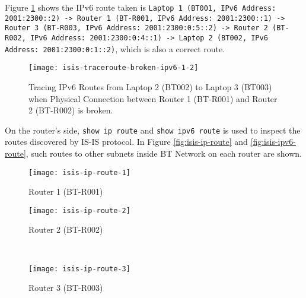 Figure \ref{fig:isis-traceroute-broken-ipv6} shows the IPv6 route taken is 
\texttt{Laptop 1 (BT001, IPv6 Address: 2001:2300::2)
-> Router 1 (BT-R001, IPv6 Address: 2001:2300::1) 
-> Router 3 (BT-R003, IPv6 Address: 2001:2300:0:5::2) 
-> Router 2 (BT-R002, IPv6 Address: 2001:2300:0:4::1)
-> Laptop 2 (BT002, IPv6 Address: 2001:2300:0:1::2)}, which is also a correct route.

\begin{figure}[ht!]
    \centering
    \texttt{[image: isis-traceroute-broken-ipv6-1-2]}
    \caption{Tracing IPv6 Routes from Laptop 2 (BT002) to Laptop 3 (BT003) when Physical Connection between Router 1 (BT-R001) and Router 2 (BT-R002) is broken.}
    \label{fig:isis-traceroute-broken-ipv6}
\end{figure}

\clearpage

On the router's side, \texttt{show ip route} and \texttt{show ipv6 route} is used to inspect the routes discovered by IS-IS protocol. In Figure \ref{fig:isis-ip-route} and \ref{fig:isis-ipv6-route}, such routes to other subnets inside BT Network on each router are shown.

\begin{figure*}[ht!]
    \centering
    \begin{subfigure}[b]{0.67\textwidth}
        \centering
        \texttt{[image: isis-ip-route-1]}
        \caption{Router 1 (BT-R001)}
    \end{subfigure}
    \hfill
    \begin{minipage}[b]{0.3\textwidth}
	    \begin{subfigure}[b]{\linewidth}
	        \centering
	        \texttt{[image: isis-ip-route-2]}
	        \caption{Router 2 (BT-R002)}
	    \end{subfigure}
	    \\
	    \begin{subfigure}[b]{\linewidth}
	        \centering
	        \texttt{[image: isis-ip-route-3]}
	        \caption{Router 3 (BT-R003)}
	    \end{subfigure}
	\end{minipage}
    \caption{IPv4 Routes to Other Subnets on All $3$ Routers Respectively using \texttt{show ip route}.}
    \label{fig:isis-ip-route}
\end{figure*}


